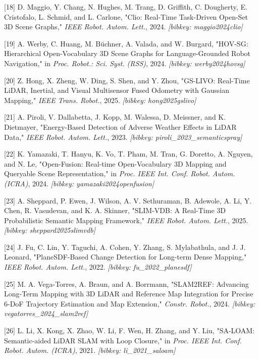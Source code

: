\documentclass[
]{article}
\begin{document}
{[}18{]} D. Maggio, Y. Chang, N. Hughes, M. Trang, D. Griffith, C.
Dougherty, E. Cristofalo, L. Schmid, and L. Carlone, "Clio: Real-Time
Task-Driven Open-Set 3D Scene Graphs," \emph{IEEE Robot. Autom. Lett.},
2024. \emph{{[}bibkey: maggio2024clio{]}}

{[}19{]} A. Werby, C. Huang, M. Büchner, A. Valada, and W. Burgard,
"HOV-SG: Hierarchical Open-Vocabulary 3D Scene Graphs for
Language-Grounded Robot Navigation," in \emph{Proc. Robot.: Sci. Syst.
(RSS)}, 2024. \emph{{[}bibkey: werby2024hovsg{]}}

{[}20{]} Z. Hong, X. Zheng, W. Ding, S. Shen, and Y. Zhou, "GS-LIVO:
Real-Time LiDAR, Inertial, and Visual Multisensor Fused Odometry with
Gaussian Mapping," \emph{IEEE Trans. Robot.}, 2025. \emph{{[}bibkey:
hong2025gslivo{]}}

{[}21{]} A. Piroli, V. Dallabetta, J. Kopp, M. Walessa, D. Meissner, and
K. Dietmayer, "Energy-Based Detection of Adverse Weather Effects in
LiDAR Data," \emph{IEEE Robot. Autom. Lett.}, 2023. \emph{{[}bibkey:
piroli\_2023\_semanticspray{]}}

{[}22{]} K. Yamazaki, T. Hanyu, K. Vo, T. Pham, M. Tran, G. Doretto, A.
Nguyen, and N. Le, "Open-Fusion: Real-time Open-Vocabulary 3D Mapping
and Queryable Scene Representation," in \emph{Proc. IEEE Int. Conf.
Robot. Autom. (ICRA)}, 2024. \emph{{[}bibkey: yamazaki2024openfusion{]}}

{[}23{]} A. Sheppard, P. Ewen, J. Wilson, A. V. Sethuraman, B. Adewole,
A. Li, Y. Chen, R. Vasudevan, and K. A. Skinner, "SLIM-VDB: A Real-Time
3D Probabilistic Semantic Mapping Framework," \emph{IEEE Robot. Autom.
Lett.}, 2025. \emph{{[}bibkey: sheppard2025slimvdb{]}}

{[}24{]} J. Fu, C. Lin, Y. Taguchi, A. Cohen, Y. Zhang, S. Mylabathula,
and J. J. Leonard, "PlaneSDF-Based Change Detection for Long-term Dense
Mapping," \emph{IEEE Robot. Autom. Lett.}, 2022. \emph{{[}bibkey:
fu\_2022\_planesdf{]}}

{[}25{]} M. A. Vega-Torres, A. Braun, and A. Borrmann, "SLAM2REF:
Advancing Long-Term Mapping with 3D LiDAR and Reference Map Integration
for Precise 6-DoF Trajectory Estimation and Map Extension,"
\emph{Constr. Robot.}, 2024. \emph{{[}bibkey:
vegatorres\_2024\_slam2ref{]}}

{[}26{]} L. Li, X. Kong, X. Zhao, W. Li, F. Wen, H. Zhang, and Y. Liu,
"SA-LOAM: Semantic-aided LiDAR SLAM with Loop Closure," in \emph{Proc.
IEEE Int. Conf. Robot. Autom. (ICRA)}, 2021. \emph{{[}bibkey:
li\_2021\_saloam{]}}
\end{document}
